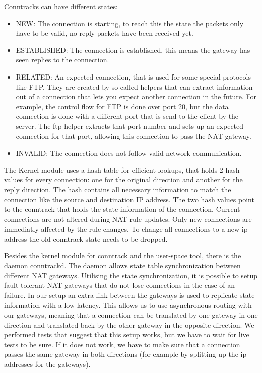 \documentclass{report}
\begin{document}
Conntracks can have different states:

\begin{itemize}
\item
  NEW: The connection is starting, to reach this the state the packets
  only have to be valid, no reply packets have been received yet.
\item
  ESTABLISHED: The connection is established, this means the gateway has
  seen replies to the connection.
\item
  RELATED: An expected connection, that is used for some special
  protocols like FTP. They are created by so called helpers that can
  extract information out of a connection that lets you expect another
  connection in the future. For example, the control flow for FTP is done
  over port 20, but the data connection is done with a different port
  that is send to the client by the server. The ftp helper extracts that
  port number and sets up an expected connection for that port, allowing
  this connection to pass the NAT gateway.
\item
  INVALID: The connection does not follow valid network communication.
\end{itemize}

The Kernel module uses a hash table for efficient lookups, that holds 2
hash values for every connection: one for the original direction and another
for the reply direction. The hash contains all necessary information to
match the connection like the source and destination IP address. The two
hash values point to the conntrack that holds the state information of
the connection. Current connections are not altered during NAT rule updates.
Only new connections are immediatly affected by the rule changes. To change all
connections to a new ip address the old conntrack state needs to be dropped.

Besides the kernel module for conntrack and the user-space tool, there is the
daemon conntrackd. The daemon allows state table synchronization
between different NAT gateways. Utilising the state synchronization, it is
possible to setup fault tolerant NAT gateways that do not lose
connections in the case of an failure. In our setup an extra link
between the gateways is used to replicate state information with a low-latency.
This allows us to use asynchronous routing with our gateways, meaning that a
connection can be translated by one gateway in one
direction and translated back by the other gateway in the opposite
direction. We performed tests that suggest that this setup works, but we have
to wait for live tests to be sure. If it does not work,
we have to make sure that a connection passes the same gateway in both
directions (for example by splitting up the ip addresses for the
gateways).
\end{document}
